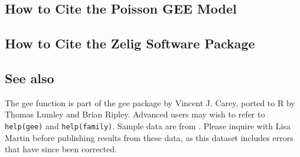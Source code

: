 \subsection*{How to Cite the Poisson GEE Model}

\subsection*{How to Cite the Zelig Software Package}
\CiteZelig

\subsection*{See also}
The gee function is part of the gee package by Vincent J. Carey, ported to R by Thomas Lumley and Brian Ripley.  Advanced users may wish to refer to \texttt{help(gee)} and \texttt{help(family)}.  Sample data are from \cite{Martin92}.  Please inquire with Lisa Martin before publishing
results from these data, as this dataset includes errors that have since
been corrected.





